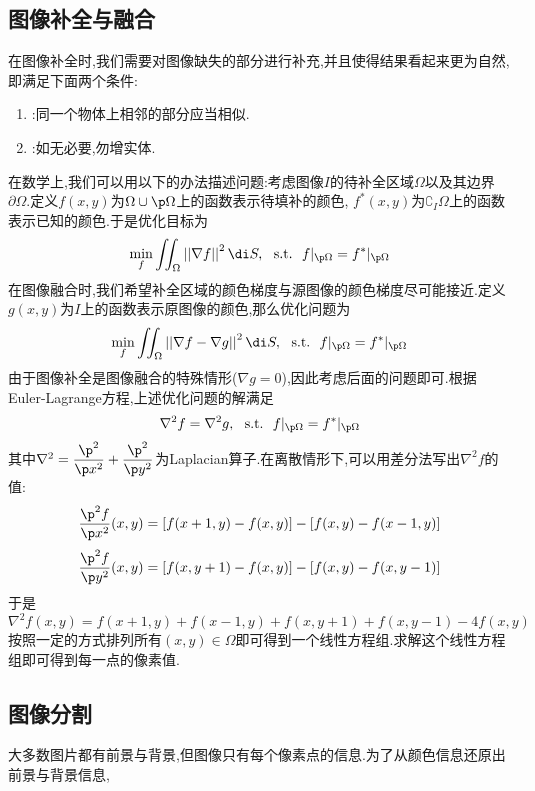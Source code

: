 \documentclass{ctexart}
\begin{document}
\subsection{图像补全与融合}
在图像补全时,我们需要对图像缺失的部分进行补充,并且使得结果看起来更为自然,即满足下面两个条件:
\begin{enumerate}[label=\tbf{\arabic*.},topsep=0pt,parsep=0pt,itemsep=0pt,partopsep=0pt]
    \item {}:同一个物体上相邻的部分应当相似.
    \item {}:如无必要,勿增实体.
\end{enumerate}
\indent 在数学上,我们可以用以下的办法描述问题:考虑图像$I$的待补全区域$\Omega$以及其边界$\partial \Omega$.定义$f(x,y)$为$\Omega\cup\p\Omega$上的函数表示待填补的颜色, $f^\ast(x,y)$为$\complement_I\Omega$上的函数表示已知的颜色.于是优化目标为
\[\min_f\iint_{\Omega}\left|\left|\nabla f\right|\right|^2\di S,\ \ \text{s.t.}\ \ f|_{\p\Omega}=f^\ast|_{\p\Omega}\]
在图像融合时,我们希望补全区域的颜色梯度与源图像的颜色梯度尽可能接近.定义$g(x,y)$为$I$上的函数表示原图像的颜色,那么优化问题为
\[\min_f\iint_{\Omega}\left|\left|\nabla f-\nabla g\right|\right|^2\di S,\ \ \text{s.t.}\ \ f|_{\p\Omega}=f^\ast|_{\p\Omega}\]
由于图像补全是图像融合的特殊情形($\nabla g=0$),因此考虑后面的问题即可.根据Euler-Lagrange方程,上述优化问题的解满足
\[\nabla^2f=\nabla^2g,\ \ \text{s.t.}\ \ f|_{\p\Omega}=f^\ast|_{\p\Omega}\]
其中$\nabla^2=\dfrac{\p^2}{\p x^2}+\dfrac{\p^2}{\p y^2}$为Laplacian算子.在离散情形下,可以用差分法写出$\nabla^2f$的值:
\[\dfrac{\p^2f}{\p x^2}(x,y)=[f(x+1,y)-f(x,y)]-[f(x,y)-f(x-1,y)]\]
\[\dfrac{\p^2f}{\p y^2}(x,y)=[f(x,y+1)-f(x,y)]-[f(x,y)-f(x,y-1)]\]
于是
\[\nabla^2 f(x,y)=f(x+1,y)+f(x-1,y)+f(x,y+1)+f(x,y-1)-4f(x,y)\]
按照一定的方式排列所有$(x,y)\in\Omega$即可得到一个线性方程组.求解这个线性方程组即可得到每一点的像素值.
\subsection{图像分割}
大多数图片都有前景与背景,但图像只有每个像素点的信息.为了从颜色信息还原出前景与背景信息,
\end{document}
